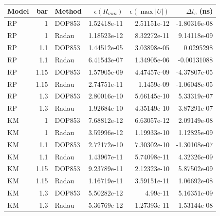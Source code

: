 \begin{tabular}{lrlrrr}
\toprule
Model & bar & Method & $\epsilon(R_{min})$ & $\epsilon(\max|U|)$ & $\Delta t_c$ (ns)\\\midrule
RP & 1 & DOP853 & 1.52418e-11 & 2.51151e-12 & -1.80316e-08\\
RP & 1 & Radau & 1.18523e-12 & 8.32272e-11 & 9.14118e-09\\
RP & 1.1 & DOP853 & 1.44512e-05 & 3.03898e-05 & 0.0295298\\
RP & 1.1 & Radau & 6.41543e-07 & 1.34905e-06 & -0.00131088\\
RP & 1.15 & DOP853 & 1.57905e-09 & 4.47457e-09 & -4.37807e-05\\
RP & 1.15 & Radau & 2.74751e-11 & 1.1459e-09 & -1.06048e-05\\
RP & 1.3 & DOP853 & 2.80016e-10 & 5.66145e-10 & 5.33319e-07\\
RP & 1.3 & Radau & 1.92684e-10 & 4.35149e-10 & -3.87291e-07\\
KM & 1 & DOP853 & 7.68812e-12 & 6.63057e-12 & 2.09149e-08\\
KM & 1 & Radau & 3.59996e-12 & 1.19933e-10 & 1.12825e-09\\
KM & 1.1 & DOP853 & 2.72172e-10 & 7.30302e-10 & -1.30108e-07\\
KM & 1.1 & Radau & 1.43967e-11 & 5.74098e-11 & 4.32326e-09\\
KM & 1.15 & DOP853 & 9.23789e-11 & 2.12323e-10 & 5.87502e-09\\
KM & 1.15 & Radau & 1.16719e-11 & 3.59151e-11 & 1.06692e-08\\
KM & 1.3 & DOP853 & 5.50282e-12 & 4.99e-11 & 5.16351e-09\\
KM & 1.3 & Radau & 5.36769e-12 & 1.27393e-11 & 1.53144e-08\\
\bottomrule
\end{tabular}
